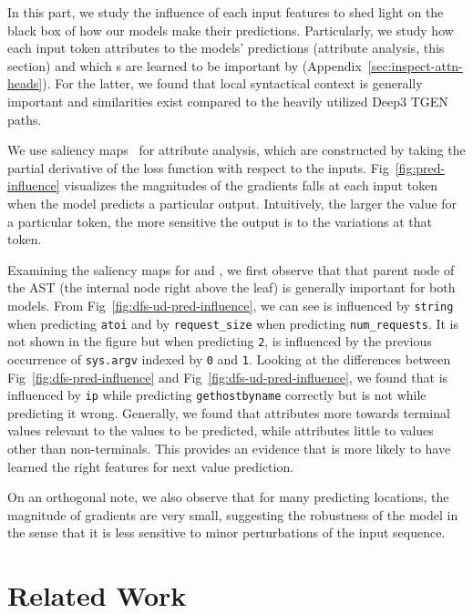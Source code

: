 \documentclass[nonacm, sigconf]{acmart}
\newcommand{\code}[1]{{\texttt{#1}}}
\newcommand{\figref}[1]{Fig~\ref{#1}}
\begin{document}
In this part, we study the influence of each input features to shed light on the black box of how our models make their predictions. 
Particularly, we study how each input token attributes to the models' predictions (attribute analysis, this section) and which s are learned to be important by \TreeRel (Appendix~\ref{sec:inspect-attn-heads}).
For the latter, we found that local syntactical context is generally important and similarities exist compared to the heavily utilized Deep3 TGEN paths.


We use saliency maps~\cite{simonyan2013deep-saliency} for attribute analysis,
which are constructed by taking the partial derivative of the loss function with respect to the inputs.
\figref{fig:pred-influence} visualizes the magnitudes of the gradients falls at each input token when the model predicts a particular output.
Intuitively, the larger the value for a particular token, the more sensitive the output is to the variations at that token. 

Examining the saliency maps for \DFS and \TreeRel, we first observe that that parent node of the AST (the internal node right above the leaf) is generally important for both models.
From \figref{fig:dfs-ud-pred-influence}, we can see \TreeRel is influenced 
by \code{string} when predicting \code{atoi} 
and by \code{request\_size} when predicting \code{num\_requests}.
It is not shown in the figure but when predicting \code{2}, \TreeRel is influenced by the previous occurrence of \code{sys.argv} indexed by \code{0} and \code{1}.
Looking at the differences between \figref{fig:dfs-pred-influence} and \figref{fig:dfs-ud-pred-influence}, we found that \TreeRel is influenced by \code{ip} while predicting \code{gethostbyname} correctly but \DFS is not while predicting it wrong.
Generally, we found that \TreeRel attributes more towards terminal values relevant to the values to be predicted, while \DFS attributes little to values other than non-terminals.
This provides an evidence that \TreeRel is more likely to have learned the right features for next value prediction.

On an orthogonal note, we also observe that for many predicting locations, the magnitude of gradients are very small,
suggesting the robustness of the model in the sense that it is less sensitive to minor perturbations of the input sequence.

 
\section{Related Work}
\label{sec:related-works}
\end{document}
